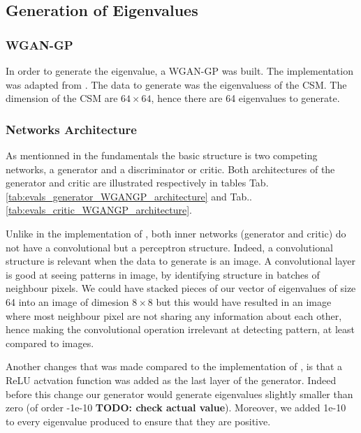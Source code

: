 \documentclass{article}
\begin{document}
\subsection{Generation of Eigenvalues}

\subsubsection{WGAN-GP}

In order to generate the eigenvalue, a WGAN-GP was built. The implementation was adapted from \cite{nain2020wgangp}. The data to generate was the eigenvaluess of the CSM. The dimension of the CSM are $64 \times 64$, hence there are 64 eigenvalues to generate.

\subsubsection{Networks Architecture}

As mentionned in the fundamentals the basic structure is two competing networks, a generator and a discriminator or critic. Both architectures of the generator and critic are illustrated respectively in tables Tab.\ref{tab:evals_generator_WGANGP_architecture} and Tab..\ref{tab:evals_critic_WGANGP_architecture}.

Unlike in the implementation of \cite{nain2020wgangp}, both inner networks (generator and critic) do not have a convolutional but a perceptron structure. Indeed, a convolutional structure is relevant when the data to generate is an image. A convolutional layer is good at seeing patterns in image, by identifying structure in batches of neighbour pixels. We could have stacked pieces of our vector of eigenvalues of size 64 into an image of dimesion $8 \times 8$ but this would have resulted in an image where most neighbour pixel are not sharing any information about each other, hence making the convolutional operation irrelevant at detecting pattern, at least compared to images.

Another changes that was made compared to the implementation of \cite{nain2020wgangp}, is that a ReLU actvation function was added as the last layer of the generator. Indeed before this change our generator would generate eigenvalues slightly smaller than zero (of order -1e-10 \textbf{TODO: check actual value}). Moreover, we added 1e-10 to every eigenvalue produced to ensure that they are positive.
\end{document}
